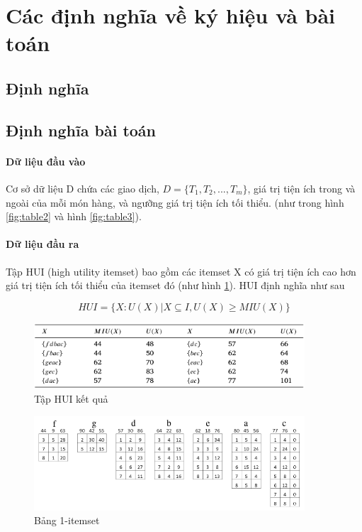 \section{Các định nghĩa về ký hiệu và bài toán}

\subsection{Định nghĩa}
 

\subsection{Định nghĩa bài toán}

\paragraph{Dữ liệu đầu vào} Cơ sở dữ liệu D chứa các giao dịch, $D = \{T_1, T_2, ..., T_m\}$, giá trị tiện ích trong và ngoài của mỗi món hàng, và ngưỡng giá trị tiện ích tối thiểu. (như trong hình \ref{fig:table2} và hình \ref{fig:table3}).

\paragraph{Dữ liệu đầu ra} Tập HUI (high utility itemset) bao gồm các itemset X có giá trị tiện ích cao hơn giá trị tiện ích tối thiểu của itemset đó (như hình \ref{fig:table6}). HUI định nghĩa như sau

$$HUI = \{ X : U(X) | X \subseteq I, U(X) \geq MIU(X) \} $$

\begin{figure}[h]
\centering
\includegraphics[width=0.9\textwidth]{image/table/table6.PNG}
\caption{\label{fig:table6} Tập HUI kết quả}
\end{figure}

\begin{figure}[h]
\centering
\includegraphics[width=0.9\textwidth]{image/algo/1itemset.PNG}
\caption{\label{fig:1itemset} Bảng 1-itemset}
\end{figure}

